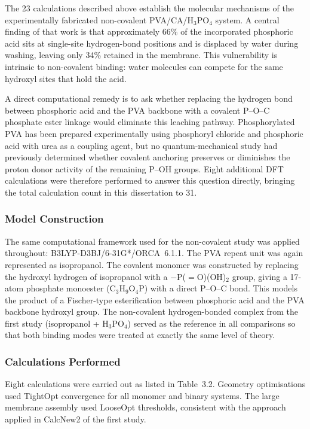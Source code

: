 \documentclass[12pt,a4paper]{report}
\begin{document}
The 23 calculations described above establish the molecular 
mechanisms of the experimentally fabricated non-covalent 
PVA/CA/H\(_3\)PO\(_4\) system. A central finding of that 
work is that approximately 66\% of the incorporated 
phosphoric acid sits at single-site hydrogen-bond positions 
and is displaced by water during washing, leaving only 34\% 
retained in the membrane. This vulnerability is intrinsic 
to non-covalent binding: water molecules can compete for 
the same hydroxyl sites that hold the acid.

A direct computational remedy is to ask whether replacing 
the hydrogen bond between phosphoric acid and the PVA 
backbone with a covalent P--O--C phosphate ester linkage 
would eliminate this leaching pathway. Phosphorylated PVA 
has been prepared experimentally using phosphoryl chloride 
and phosphoric acid with urea as a coupling agent, but no 
quantum-mechanical study had previously determined whether 
covalent anchoring preserves or diminishes the proton 
donor activity of the remaining P--OH groups. Eight 
additional DFT calculations were therefore performed to 
answer this question directly, bringing the total 
calculation count in this dissertation to 31.

\subsubsection{Model Construction}

The same computational framework used for the non-covalent 
study was applied throughout: B3LYP-D3BJ/6-31G*/ORCA~6.1.1. 
The PVA repeat unit was again represented as isopropanol. 
The covalent monomer was constructed by replacing the 
hydroxyl hydrogen of isopropanol with a 
$-$P($=$O)(OH)$_2$ group, giving a 17-atom phosphate 
monoester (C$_3$H$_9$O$_4$P) with a direct P--O--C bond. 
This models the product of a Fischer-type esterification 
between phosphoric acid and the PVA backbone hydroxyl 
group. The non-covalent hydrogen-bonded complex from the 
first study (isopropanol + H\(_3\)PO\(_4\)) served as the 
reference in all comparisons so that both binding modes 
were treated at exactly the same level of theory.

\subsubsection{Calculations Performed}

Eight calculations were carried out as listed in 
Table~3.2. Geometry optimisations used TightOpt convergence 
for all monomer and binary systems. The large membrane 
assembly used LooseOpt thresholds, consistent with the 
approach applied in CalcNew2 of the first study.
\end{document}
